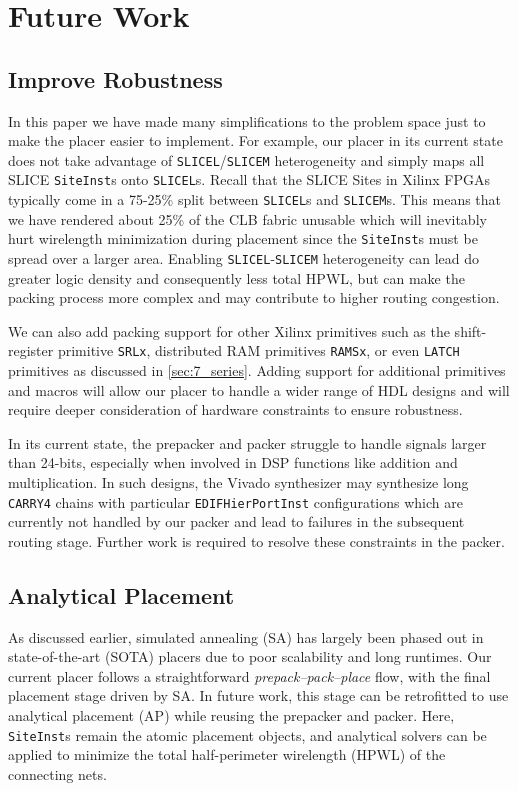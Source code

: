 \section{Future Work}


\subsection{Improve Robustness}
In this paper we have made many simplifications to the problem space just to make the placer easier to implement.
For example, our placer in its current state does not take advantage of \texttt{SLICEL}/\texttt{SLICEM} heterogeneity and simply maps all SLICE \texttt{SiteInst}s onto \texttt{SLICEL}s. 
Recall that the SLICE Sites in Xilinx FPGAs typically come in a 75-25\% split between \texttt{SLICEL}s and \texttt{SLICEM}s. 
This means that we have rendered about 25\% of the CLB fabric unusable which will inevitably hurt wirelength minimization during placement since the \texttt{SiteInst}s must be spread over a larger area. 
Enabling \texttt{SLICEL}-\texttt{SLICEM} heterogeneity can lead do greater logic density and consequently less total HPWL, but can make the packing process more complex and may contribute to higher routing congestion.

We can also add packing support for other Xilinx primitives such as the shift-register primitive \texttt{SRLx}, distributed RAM primitives \texttt{RAMSx}, or even \texttt{LATCH} primitives as discussed in \ref{sec:7_series}.
Adding support for additional primitives and macros will allow our placer to handle a wider range of HDL designs and will require deeper consideration of hardware constraints to ensure robustness.

In its current state, the prepacker and packer struggle to handle signals larger than 24-bits, especially when involved in DSP functions like addition and multiplication. 
In such designs, the Vivado synthesizer may synthesize long \texttt{CARRY4} chains with particular \texttt{EDIFHierPortInst} configurations which are currently not handled by our packer and lead to failures in the subsequent routing stage.
Further work is required to resolve these constraints in the packer.

\subsection{Analytical Placement}
As discussed earlier, simulated annealing (SA) has largely been phased out in state-of-the-art (SOTA) placers due to poor scalability and long runtimes. 
Our current placer follows a straightforward \emph{prepack–pack–place} flow, with the final placement stage driven by SA. 
In future work, this stage can be retrofitted to use analytical placement (AP) while reusing the prepacker and packer. 
Here, \texttt{SiteInst}s remain the atomic placement objects, and analytical solvers can be applied to minimize the total half-perimeter wirelength (HPWL) of the connecting nets.

